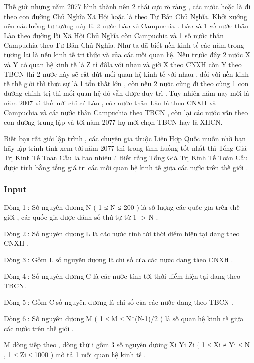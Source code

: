 



   Thế giới những năm 2077 hình thành nên 2 thái cực rõ ràng , các nước hoặc là đi theo con đường Chủ Nghĩa Xã Hội hoặc là theo Tư Bản Chủ Nghĩa. Khởi xướng nên các luồng tư tưởng này là 2 nước Lào và Campuchia . Lào và 1 số nước thân Lào theo đường lối Xã Hội Chủ Nghĩa còn Campuchia và 1 số nước thân Campuchia theo Tư Bản Chủ Nghĩa. Như ta đã biết nền kinh tế các năm trong tương lai là nền kinh tế tri thức và của các mối quan hệ. Nếu trước đây 2 nước X và Y có quan hệ kinh tế là Z tỉ đôla với nhau và giờ X theo CNXH còn Y theo TBCN thì 2 nước này sẽ cắt đứt mối quan hệ kinh tế với nhau , đối với nền kinh tế thế giới thì thực sự là 1 tổn thất lớn , còn nếu 2 nước cùng đi theo cùng 1 con đường chính trị thì mối quan hệ đó vẫn được duy trì . Tuy nhiên năm nay mới là năm 2007 vì thế mới chỉ có Lào , các nước thân Lào là theo CNXH và Campuchia và các nước thân Campuchia theo TBCN , còn lại các nước vẫn theo con đường trung lập và tới năm 2077 họ mới chọn TBCN hay là XHCN.   


   Biết bạn rất giỏi lập trình , các chuyên gia thuộc Liên Hợp Quốc muốn nhờ bạn hãy lập trình tính xem tới năm 2077 thì trong tình huống tốt nhất thì Tổng Giá Trị Kinh Tế Toàn Cầu là bao nhiêu ? Biết rằng Tổng Giá Trị Kinh Tế Toàn Cầu được tính bằng tổng giá trị các mối quan hệ kinh tế giữa các nước trên thế giới .  

\subsubsection{   Input  }

   Dòng 1 : Số nguyên dương N ( 1 ≤ N ≤ 200 ) là số lượng các quốc gia trên thế giới , các quốc gia được đánh số thứ tự từ 1 -> N .   


   Dòng 2 : Số nguyên dương L là các nước tính tới thời điểm hiện tại đang theo CNXH .   


   Dòng 3 : Gồm L số nguyên dương là chỉ số của các nước đang theo CNXH .   


   Dòng 4 : Số nguyên dương C là các nước tính tới thời điểm hiện tại đang theo TBCN.   


   Dòng 5 : Gồm C số nguyên dương là chỉ số của các nước đang theo TBCN .   


   Dòng 6 : Số nguyên dương M ( 1 ≤ M ≤ N*(N-1)/2 ) là số quan hệ kinh tế giữa các nước trên thế giới .   


   M dòng tiếp theo , dòng thứ i gồm 3 số nguyên dương Xi Yi Zi ( 1 ≤ Xi ≠ Yi ≤ N , 1 ≤ Zi ≤ 1000 ) mô tả 1 mối quan hệ kinh tế .  


